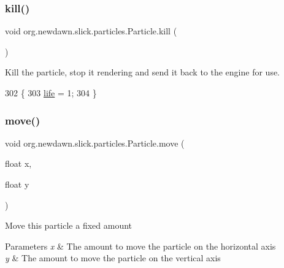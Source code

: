\subsubsection{\texorpdfstring{kill()}{kill()}}
{\footnotesize\ttfamily void org.\+newdawn.\+slick.\+particles.\+Particle.\+kill (\begin{DoxyParamCaption}{ }\end{DoxyParamCaption})\hspace{0.3cm}{\ttfamily [inline]}}

Kill the particle, stop it rendering and send it back to the engine for use. 
\begin{DoxyCode}
302                        \{
303         \mbox{\hyperlink{classorg_1_1newdawn_1_1slick_1_1particles_1_1_particle_a361d2a9d01b66d38d90496c096970aab}{life}} = 1;
304     \}
\end{DoxyCode}
\mbox{\label{classorg_1_1newdawn_1_1slick_1_1particles_1_1_particle_a595740fdaba4843ae46e9b7ca5d2e5ba}} 
\subsubsection{\texorpdfstring{move()}{move()}}
{\footnotesize\ttfamily void org.\+newdawn.\+slick.\+particles.\+Particle.\+move (\begin{DoxyParamCaption}\item[{float}]{x,  }\item[{float}]{y }\end{DoxyParamCaption})\hspace{0.3cm}{\ttfamily [inline]}}

Move this particle a fixed amount


\begin{DoxyParams}{Parameters}
{\em x} & The amount to move the particle on the horizontal axis \\
\hline
{\em y} & The amount to move the particle on the vertical axis \\
\hline
\end{DoxyParams}

